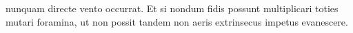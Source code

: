 nunquam\hspace{1pt} directe\hspace{1pt} vento\hspace{1pt} occurrat. \hspace{1pt}Et\hspace{1pt} si\hspace{1pt} nondum\hspace{1pt} fidis\hspace{1pt} possunt\hspace{1pt} multiplicari\hspace{1pt} toties mutari foramina, ut non possit tandem non aeris extrinsecus impetus evanescere.\pend